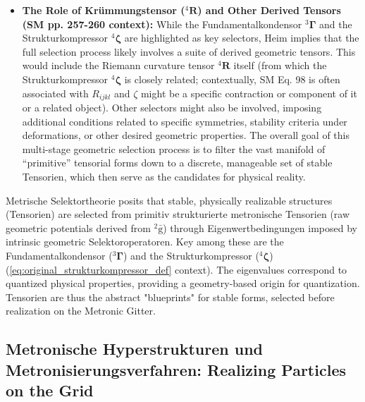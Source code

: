 \documentclass[12pt]{article}
\newcommand{\q}[1]{\enquote{#1}}
\newcommand{\kompositionsfeld}{{}^2\bar{\mathrm{g}}}
\newcommand{\fundamentalkondensor}{{}^3\bm{\Gamma}}
\newcommand{\strukturkompressor}{{}^4\bm{\zeta}}
\begin{document}
\begin{itemize}
    \item \textbf{The Role of Krümmungstensor (\( {}^4\mathbf{R} \)) and Other Derived Tensors (SM pp. 257-260 context):}
    While the Fundamentalkondensor \( \fundamentalkondensor \) and the Strukturkompressor \( \strukturkompressor \) are highlighted as key selectors, Heim implies that the full selection process likely involves a suite of derived geometric tensors. This would include the Riemann curvature tensor \( {}^4\mathbf{R} \) itself (from which the Strukturkompressor \( \strukturkompressor \) is closely related; contextually, SM Eq. 98 is often associated with \(R_{ijkl}\) and \( \zeta \) might be a specific contraction or component of it or a related object). Other selectors might also be involved, imposing additional conditions related to specific symmetries, stability criteria under deformations, or other desired geometric properties. The overall goal of this multi-stage geometric selection process is to filter the vast manifold of \q{primitive} tensorial forms down to a discrete, manageable set of stable Tensorien, which then serve as the candidates for physical reality.
\end{itemize}

Metrische Selektortheorie posits that stable, physically realizable structures (Tensorien) are selected from primitiv strukturierte metronische Tensorien (raw geometric potentials derived from \(\kompositionsfeld\)) through Eigenwertbedingungen imposed by intrinsic geometric Selektoroperatoren. Key among these are the Fundamentalkondensor (\(\fundamentalkondensor\)) and the Strukturkompressor (\(\strukturkompressor\)) (\eqref{eq:original_strukturkompressor_def} context). The eigenvalues correspond to quantized physical properties, providing a geometry-based origin for quantization. Tensorien are thus the abstract "blueprints" for stable forms, selected before realization on the Metronic Gitter.

\subsection{Metronische Hyperstrukturen und Metronisierungsverfahren: Realizing Particles on the Grid}
\label{sec:hyperstrukturen}
\end{document}
